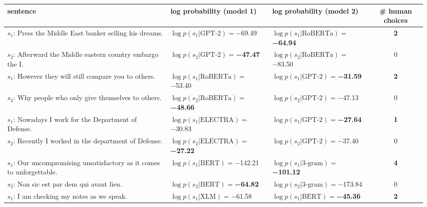 \begin{tabularx}{\textwidth}{lllc}
\toprule
                                                               sentence &                               log probability (model 1) &                               log probability (model 2) &  \# human choices \\
\midrule
                $s_1$: Press the Middle East banker selling his dreams. &             $\log p(s_1 | \textrm{GPT-2})=$\num{-69.49} &  $\log p(s_1 | \textrm{RoBERTa})=$\textbf{\num{-64.94}} &  \textbf{\num{2}} \\
             $s_2$: Afterward the Middle eastern country embargo the I. &    $\log p(s_2 | \textrm{GPT-2})=$\textbf{\num{-47.47}} &           $\log p(s_2 | \textrm{RoBERTa})=$\num{-83.50} &           \num{0} \\\midrule
                  $s_1$: However they will still compare you to others. &           $\log p(s_1 | \textrm{RoBERTa})=$\num{-53.40} &    $\log p(s_1 | \textrm{GPT-2})=$\textbf{\num{-31.59}} &  \textbf{\num{2}} \\
                  $s_2$: Why people who only give themselves to others. &  $\log p(s_2 | \textrm{RoBERTa})=$\textbf{\num{-48.66}} &             $\log p(s_2 | \textrm{GPT-2})=$\num{-47.13} &           \num{0} \\\midrule
                  $s_1$: Nowadays I work for the Department of Defense. &           $\log p(s_1 | \textrm{ELECTRA})=$\num{-30.83} &    $\log p(s_1 | \textrm{GPT-2})=$\textbf{\num{-27.64}} &  \textbf{\num{1}} \\
                 $s_2$: Recently I worked in the department of Defense. &  $\log p(s_2 | \textrm{ELECTRA})=$\textbf{\num{-27.22}} &             $\log p(s_2 | \textrm{GPT-2})=$\num{-37.40} &           \num{0} \\\midrule
 $s_1$: Our uncompromising unsatisfactory as it comes to unforgettable. &             $\log p(s_1 | \textrm{BERT})=$\num{-142.21} &  $\log p(s_1 | \textrm{3-gram})=$\textbf{\num{-101.12}} &  \textbf{\num{4}} \\
                             $s_2$: Non sic est par dem qui avant lieu. &     $\log p(s_2 | \textrm{BERT})=$\textbf{\num{-64.82}} &           $\log p(s_2 | \textrm{3-gram})=$\num{-173.84} &           \num{0} \\\midrule
                             $s_1$: I am checking my notes as we speak. &               $\log p(s_1 | \textrm{XLM})=$\num{-61.58} &     $\log p(s_1 | \textrm{BERT})=$\textbf{\num{-45.36}} &  \textbf{\num{2}} \\

\end{tabularx}
